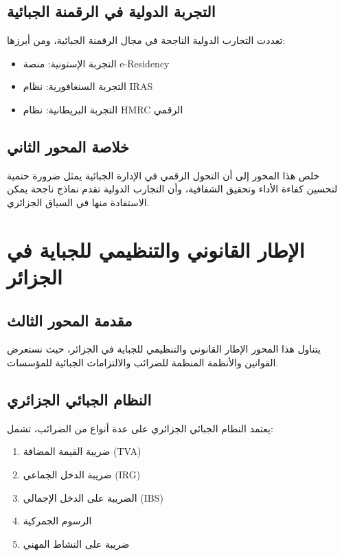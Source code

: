 \documentclass[12pt, a4paper, twoside]{report}
\begin{document}
\section{التجربة الدولية في الرقمنة الجبائية}

تعددت التجارب الدولية الناجحة في مجال الرقمنة الجبائية، ومن أبرزها:
\begin{itemize}
    \item التجربة الإستونية: منصة e-Residency
    \item التجربة السنغافورية: نظام IRAS
    \item التجربة البريطانية: نظام HMRC الرقمي
\end{itemize}

\section{خلاصة المحور الثاني}

خلص هذا المحور إلى أن التحول الرقمي في الإدارة الجبائية يمثل ضرورة حتمية لتحسين كفاءة الأداء وتحقيق الشفافية، وأن التجارب الدولية تقدم نماذج ناجحة يمكن الاستفادة منها في السياق الجزائري.

\newpage

\chapter{الإطار القانوني والتنظيمي للجباية في الجزائر}

\section{مقدمة المحور الثالث}

يتناول هذا المحور الإطار القانوني والتنظيمي للجباية في الجزائر، حيث نستعرض القوانين والأنظمة المنظمة للضرائب والالتزامات الجبائية للمؤسسات.

\section{النظام الجبائي الجزائري}

يعتمد النظام الجبائي الجزائري على عدة أنواع من الضرائب، تشمل:
\begin{enumerate}
    \item ضريبة القيمة المضافة (TVA)
    \item ضريبة الدخل الجماعي (IRG)
    \item الضريبة على الدخل الإجمالي (IBS)
    \item الرسوم الجمركية
    \item ضريبة على النشاط المهني
\end{enumerate}
\end{document}
